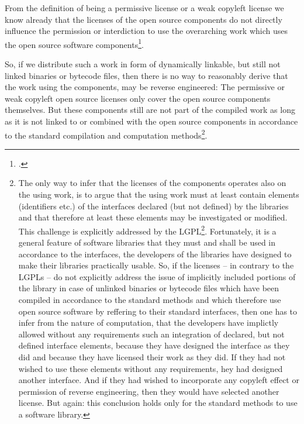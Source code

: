 From the definition of being a permissive license or a weak copyleft license we
know already that the licenses of the open source components do not directly
influence the permission or interdiction to use the overarching work which uses
the open source software components\footcite[cf.][20ff.]{Reincke2015a}.

So, if we distribute such a work in form of dynamically linkable, but still not
linked binaries or bytecode files, then there is no way to reasonably derive
that the work using the components, may be reverse engineered: The permissive or
weak copyleft open source licenses only cover the open source components
themselves. But these components still are not part of the compiled work as long
as it is not linked to or combined with the open source components in accordance
to the standard compilation and computation methods\footnote{The only way to
infer that the licenses of the components operates also on the using work, is to
argue that the using work must at least contain elements (identifiers etc.) of
the interfaces declared (but not defined) by the libraries and that therefore at
least these elements may be investigated or modified. This challenge is
explicitly addressed by the LGPL\footnote{$\rightarrow$ p.
\pageref{RevEngDistributeDynamicallyLinkedCode}}. Fortunately, it is a general
feature of software libraries that they must and shall be used in accordance to
the interfaces, the developers of the libraries have designed to make their
libraries practically usable. So, if the licenses -- in contrary to the LGPLs --
do not explicitly address the issue of implicitly included portions of the
library in case of unlinked binaries or bytecode files which have been compiled
in accordance to the standard methods and which therefore use open source
software by reffering to their standard interfaces, then one has to infer from
the nature of computation, that the developers have implictly allowed without
any requirements such an integration of declared, but not defined interface
elements, because they have designed the interface as they did and because they
have licensed their work as they did. If they had not wished to use these
elements without any requirements, hey had designed another interface. And if
they had wished to incorporate any copyleft effect or permission of reverse
engineering, then they would have selected another license. But again: this
conclusion holds only for the standard methods to use a software library.}.

